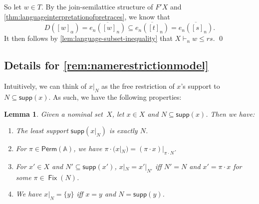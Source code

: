 \documentclass[11pt,a4paper]{amsart}
\newtheorem{lemma}[lemma]{Lemma}
\newcommand{\Perm}{\mathsf{Perm}(\Names)}
\newcommand{\Names}{\mathbb{A}}
\newcommand{\supp}{\mathsf{supp}}
\newcommand{\Fix}{\mathop{\mathsf{Fix}}}
\theoremstyle{plain}
\numberwithin{equation}{section}
\newcommand{\+}[1]{\mathcal{#1}\xspace}
\theoremstyle{definition}
\begin{document}
So let \(w \in T\).
By the join-semilattice structure of \(F' X\) and \cref{thm:languageinterpretationofpretraces}, we know that
\begin{equation*}
  D([w]_\alpha) = \overline{e_n([w]_n)} \subseteq \overline{e_n([t]_n)} = \overline{e_n([s]_n)}.
\end{equation*}
It then follows by \cref{lem:language-subset-inequality} that
\(X \vdash_n w \le rs\).  \qed

\subsection{Details for \cref{rem:namerestrictionmodel}}
\label{sec:tdrop-details}

Intuitively, we can think of $x|_N$ as the free restriction of $x$'s support to $N \subseteq \supp(x)$.
As such, we have the following properties:
\begin{lemma}
  \label{lem:restrictionproperties}
  Given a nominal set~$X$, let $x \in X$ and $N \subseteq \supp(x)$. Then we have:
  \begin{enumerate}
    \item \label{itm:restrictionsupp} The least support $\supp(x|_N)$ is exactly $N$.
    \item \label{itm:restrictionequivariant} For $\pi \in \Perm$, we have $\pi \cdot (x|_N) = (\pi \cdot x)|_{\pi \cdot N}$.
    \item \label{itm:restrictioneq} For $x' \in X$ and $N' \subseteq \supp(x')$, $x|_N = x'|_{N'}$ iff $N' = N$ and $x' = \pi \cdot x$ for some $\pi \in \Fix(N)$.
    \item \label{itm:restrictionsingle} We have $x|_N = \{y\}$ iff $x = y$ and $N = \supp(y)$.
  \end{enumerate}
\end{lemma}
\end{document}
